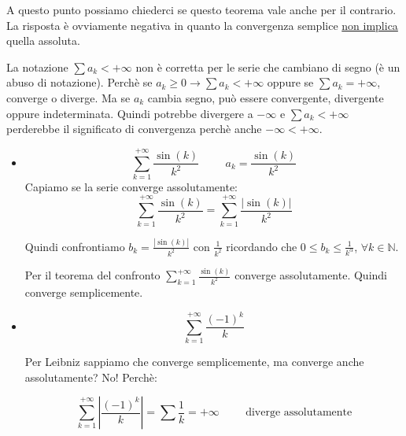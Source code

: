A questo punto possiamo chiederci se questo teorema vale anche per il contrario. La risposta è ovviamente negativa in quanto la convergenza semplice \underline{non implica} quella assoluta.

\begin{osservation*}
    La notazione $\sum a_k<+\infty$ non è corretta per le serie che cambiano di segno (è un abuso di notazione). Perchè se $a_k\geq0\to\sum a_k<+\infty$ oppure se $\sum a_k=+\infty$, converge o diverge. Ma se $a_k$ cambia segno, può essere convergente, divergente oppure indeterminata. Quindi potrebbe divergere a $-\infty$ e $\sum a_k<+\infty$ perderebbe il significato di convergenza perchè anche $-\infty<+\infty$.
\end{osservation*}

\begin{example}
    \begin{itemize}
        \item \begin{equation*}\sum^{+\infty}_{k=1}\frac{\sin(k)}{k^2}\hspace{1cm}a_k=\frac{\sin(k)}{k^2}\end{equation*}
        Capiamo se la serie converge assolutamente:
        \begin{equation*}
            \sum^{+\infty}_{k=1}\frac{\sin(k)}{k^2}=\sum^{+\infty}_{k=1}\frac{|\sin(k)|}{k^2}
        \end{equation*}
        
        Quindi confrontiamo $b_k=\frac{|\sin(k)|}{k^2}$ con $\frac{1}{k^2}$  ricordando che $0\leq b_k\leq\frac{1}{k^\alpha}$, $\forall k\in\mathbb{N}$.
        
        Per il teorema del confronto $\sum^{+\infty}_{k=1}\frac{\sin(k)}{k^2}$ converge assolutamente. Quindi converge semplicemente.
        
        \item \begin{equation*}\sum^{+\infty}_{k=1}\frac{(-1)^k}{k}\end{equation*}
        
        Per Leibniz sappiamo che converge semplicemente, ma converge anche assolutamente? No! Perchè:
        
        \begin{equation*}\sum^{+\infty}_{k=1}|\frac{(-1)^k}{k}|=\sum\frac{1}{k}=+\infty\hspace{1cm}\text{diverge assolutamente} \end{equation*}
        
    \end{itemize}
\end{example}

